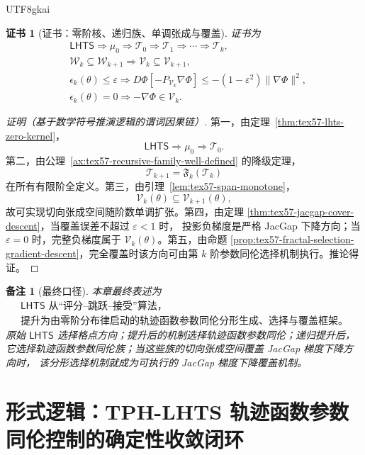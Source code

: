 \documentclass[12pt]{article}
\newtheorem{remark}{备注}[section]
\newtheorem{Certificate}{证书}[section]
\newcommand{\LHTS}{\ensuremath{\mathsf{LHTS}}}
\begin{document}
\begin{CJK*}{UTF8}{gkai}
\begin{Certificate}[证书：零阶核、递归族、单调张成与覆盖]
\label{cert:tex57-main-compressed-proposition}
证书为
\[
\begin{aligned}
&\LHTS{}\Rightarrow\mu_0\Rightarrow\mathcal T_0
\Rightarrow
\mathcal T_1
\Rightarrow\cdots\Rightarrow\mathcal T_k,\\
&\mathcal W_k\subseteq\mathcal W_{k+1}
\Rightarrow
\mathcal V_k\subseteq\mathcal V_{k+1},\\
&\epsilon_k(\theta)\le\varepsilon
\Rightarrow
D\Phi[-P_{\mathcal V_k}\nabla\Phi]
\le
-(1-\varepsilon^2)\|\nabla\Phi\|^2,\\
&\epsilon_k(\theta)=0
\Rightarrow
-\nabla\Phi\in\mathcal V_k.
\end{aligned}
\]
\end{Certificate}

\begin{proof}[证明（基于数学符号推演逻辑的谓词因果链）]
第一，由定理~\ref{thm:tex57-lhts-zero-kernel}，
\[
  \LHTS{}\Rightarrow\mu_0\Rightarrow\mathcal T_0.
\]
第二，由公理~\ref{ax:tex57-recursive-family-well-defined} 的降级定理，
\[
  \mathcal T_{k+1}=\mathfrak F_k(\mathcal T_k)
\]
在所有有限阶全定义。第三，由引理~\ref{lem:tex57-span-monotone}，
\[
  \mathcal V_k(\theta)\subseteq\mathcal V_{k+1}(\theta),
\]
故可实现切向张成空间随阶数单调扩张。第四，由定理
\ref{thm:tex57-jacgap-cover-descent}，当覆盖误差不超过 \(\varepsilon<1\) 时，
投影负梯度是严格 JacGap 下降方向；当 \(\varepsilon=0\) 时，完整负梯度属于
\(\mathcal V_k(\theta)\)。第五，由命题
\ref{prop:tex57-fractal-selection-gradient-descent}，完全覆盖时该方向可由第 \(k\)
阶参数同伦选择机制执行。推论得证。
\end{proof}

\begin{remark}[最终口径]
本章最终表述为
\[
\boxed{
\begin{gathered}
\LHTS{}
\text{ 从“评分--跳跃--接受”算法，}\\
\text{提升为由零阶分布律启动的轨迹函数参数同伦分形生成、选择与覆盖框架。}
\end{gathered}
}
\]
原始 \(\LHTS{}\) 选择格点方向；提升后的机制选择轨迹函数参数同伦；递归提升后，
它选择轨迹函数参数同伦族；当这些族的切向张成空间覆盖 JacGap 梯度下降方向时，
该分形选择机制就成为可执行的 JacGap 梯度下降覆盖机制。
\end{remark}

\section{形式逻辑：TPH-LHTS 轨迹函数参数同伦控制的确定性收敛闭环}
\label{sec:tph-lhts-deterministic-loop}


\end{CJK*}
\end{document}
